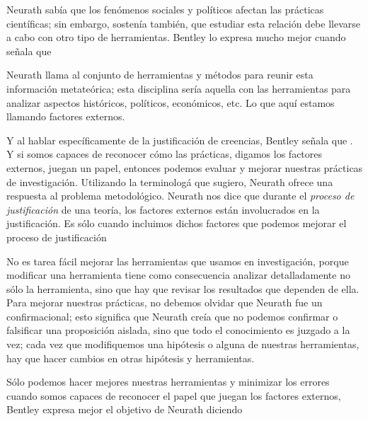 Neurath sabía que los fenómenos sociales y políticos afectan las prácticas científicas; sin embargo, sostenía también, que estudiar esta relación debe llevarse a cabo con otro tipo de herramientas.
Bentley lo expresa mucho mejor cuando señala que  \parencite[p.~62]{Bentley2023}

Neurath llama  al conjunto de herramientas y métodos para reunir esta información metateórica; 
esta disciplina sería aquella con las herramientas para analizar aspectos históricos, políticos, económicos, etc.
Lo que aquí estamos llamando factores externos.

Y al hablar específicamente de la justificación de creencias, Bentley señala que  \parencite[p.~41]{Bentley2023}.
Y si somos capaces de reconocer cómo las prácticas, digamos los factores externos,  juegan un papel, entonces podemos evaluar y mejorar nuestras prácticas de investigación.
Utilizando la terminologá que sugiero, Neurath ofrece una respuesta al
problema metodológico. Neurath nos dice que durante el \emph{proceso de
justificación} de una teoría, los factores externos están involucrados en
la justificación. Es sólo cuando incluimos dichos factores que podemos
mejorar el proceso de justificación

No es tarea fácil mejorar las herramientas que usamos en investigación, porque modificar una herramienta tiene como consecuencia analizar detalladamente no sólo la herramienta, sino que hay que revisar los resultados que dependen de ella.
Para mejorar nuestras prácticas, no debemos olvidar que Neurath fue un  confirmacional; esto significa que Neurath creía que no podemos confirmar o falsificar una proposición aislada, sino que todo el conocimiento es juzgado a la vez; 
cada vez que modifiquemos una hipótesis o alguna de nuestras herramientas, hay que hacer cambios en otras hipótesis y herramientas.

Sólo podemos hacer mejores nuestras herramientas y minimizar los errores cuando somos capaces de reconocer el papel que juegan los factores externos, Bentley expresa mejor el objetivo de Neurath diciendo  \parencite[p.~41]{Bentley2023}

